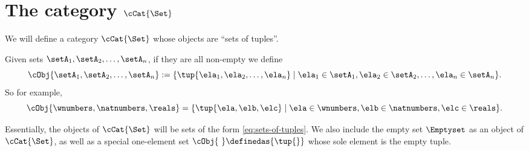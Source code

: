 
\section{The category $\cCat{\Set}$}

We will define a category $\cCat{\Set}$ whose objects are ``sets of tuples''.


%
%
%

Given sets $\setA_1, \setA_2, \dots , \setA_n$, if they are all non-empty we define
\begin{equation}\label{eq:sets-of-tuples}
   \cObj{\setA_1, \setA_2, \dots, \setA_n} := \{ \tup{\ela_1, \ela_2, \dots, \ela_n} \mid \ela_1 \in \setA_1, \ela_2 \in \setA_2, \dots, \ela_n \in \setA_n \}.
\end{equation}
So for example,
\begin{equation}
    \cObj{\wnumbers, \natnumbers, \reals} = \{ \tup{\ela, \elb, \elc} \mid \ela \in \wnumbers, \elb \in \natnumbers, \elc \in \reals \}.
\end{equation}



Essentially, the objects of $\cCat{\Set}$ will be sets of the form \cref{eq:sets-of-tuples}. We also include the empty set $\Emptyset$ as an object of $\cCat{\Set}$, as well as a special one-element set $\cObj{ \ } \definedas \{ \tup{} \}$ whose sole element is the empty tuple.

